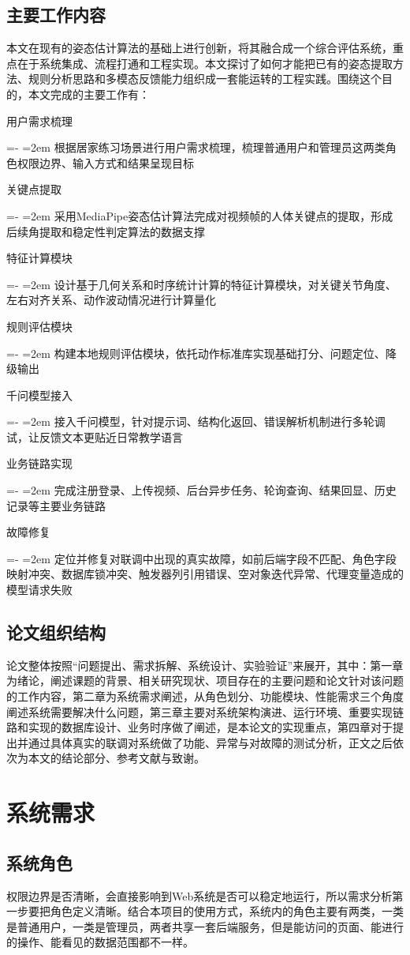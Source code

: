 \documentclass[UTF8,twoside]{ctexrep}
\makeatletter
\def@NAT@last@yr{\@citea}%
\def@NAT@last@yr{-\NAT@penalty}%
\newcommand{\researchitem}[2]{%
  \item #1%
  \par\begingroup
    \leftskip=-\leftmargin
    \rightskip=0pt
    \parindent=2em
    \noindent\hspace*{2em}\ignorespaces#2\unskip\par
  \endgroup
}
\makeatother
\begin{document}
\section{主要工作内容}
本文在现有的姿态估计算法的基础上进行创新，将其融合成一个综合评估系统，重点在于系统集成、流程打通和工程实现。本文探讨了如何才能把已有的姿态提取方法、规则分析思路和多模态反馈能力组织成一套能运转的工程实践。围绕这个目的，本文完成的主要工作有：
\begin{researchlist}
  \researchitem{用户需求梳理}{
    根据居家练习场景进行用户需求梳理，梳理普通用户和管理员这两类角色权限边界、输入方式和结果呈现目标
  }
  \researchitem{关键点提取}{
    采用MediaPipe姿态估计算法\cite{ref_mediapipe}完成对视频帧的人体关键点的提取，形成后续角提取和稳定性判定算法的数据支撑
  }
  \researchitem{特征计算模块}{
    设计基于几何关系和时序统计计算的特征计算模块，对关键关节角度、左右对齐关系、动作波动情况进行计算量化
  }
  \researchitem{规则评估模块}{
    构建本地规则评估模块，依托动作标准库实现基础打分、问题定位、降级输出
  }
  \researchitem{千问模型接入}{
    接入千问模型，针对提示词、结构化返回、错误解析机制进行多轮调试，让反馈文本更贴近日常教学语言
  }
  \researchitem{业务链路实现}{
    完成注册登录、上传视频、后台异步任务、轮询查询、结果回显、历史记录等主要业务链路
  }
  \researchitem{故障修复}{
    定位并修复对联调中出现的真实故障，如前后端字段不匹配、角色字段映射冲突、数据库锁冲突、触发器列引用错误、空对象迭代异常、代理变量造成的模型请求失败
  }
\end{researchlist}



\section{论文组织结构}论文整体按照“问题提出、需求拆解、系统设计、实验验证”来展开，其中：第一章为绪论，阐述课题的背景、相关研究现状、项目存在的主要问题和论文针对该问题的工作内容，第二章为系统需求阐述，从角色划分、功能模块、性能需求三个角度阐述系统需要解决什么问题，第三章主要对系统架构演进、运行环境、重要实现链路和实现的数据库设计、业务时序做了阐述，是本论文的实现重点，第四章对于提出并通过具体真实的联调对系统做了功能、异常与对故障的测试分析，正文之后依次为本文的结论部分、参考文献与致谢。


\chapter{系统需求}

\section{系统角色}
权限边界是否清晰，会直接影响到Web系统是否可以稳定地运行，所以需求分析第一步要把角色定义清晰。结合本项目的使用方式，系统内的角色主要有两类，一类是普通用户，一类是管理员，两者共享一套后端服务，但是能访问的页面、能进行的操作、能看见的数据范围都不一样。
\end{document}
